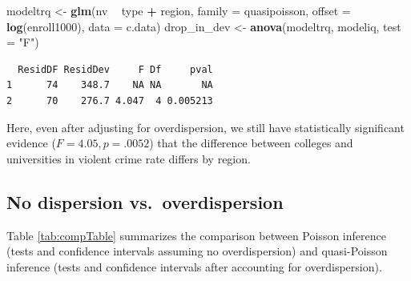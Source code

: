 \documentclass[
]{krantz}
\newenvironment{Shaded}{\begin{snugshade}}{\end{snugshade}}
\newcommand{\DataTypeTok}[1]{\textcolor[rgb]{0.27,0.27,0.27}{#1}}
\newcommand{\KeywordTok}[1]{\textcolor[rgb]{0.27,0.27,0.27}{\textbf{#1}}}
\newcommand{\NormalTok}[1]{#1}
\newcommand{\OperatorTok}[1]{\textcolor[rgb]{0.43,0.43,0.43}{\textbf{#1}}}
\newcommand{\StringTok}[1]{\textcolor[rgb]{0.5,0.5,0.5}{#1}}
\begin{document}
\begin{Shaded}
\begin{Highlighting}[]
\NormalTok{modeltrq <-}\StringTok{ }\KeywordTok{glm}\NormalTok{(nv }\OperatorTok{~}\StringTok{ }\NormalTok{type }\OperatorTok{+}\StringTok{ }\NormalTok{region, }\DataTypeTok{family =}\NormalTok{ quasipoisson,}
               \DataTypeTok{offset =} \KeywordTok{log}\NormalTok{(enroll1000), }\DataTypeTok{data =}\NormalTok{ c.data)}
\NormalTok{drop_in_dev <-}\StringTok{ }\KeywordTok{anova}\NormalTok{(modeltrq, modeliq, }\DataTypeTok{test =} \StringTok{"F"}\NormalTok{)}
\end{Highlighting}
\end{Shaded}

\begin{verbatim}
  ResidDF ResidDev     F Df     pval
1      74    348.7    NA NA       NA
2      70    276.7 4.047  4 0.005213
\end{verbatim}

Here, even after adjusting for overdispersion, we still have statistically significant evidence (\(F=4.05, p=.0052\)) that the difference between colleges and universities in violent crime rate differs by region.

\hypertarget{no-dispersion-vs.-overdispersion}{%
\subsection{No dispersion vs.~overdispersion}\label{no-dispersion-vs.-overdispersion}}

Table \ref{tab:compTable} summarizes the comparison between Poisson inference (tests and confidence intervals assuming no overdispersion) and quasi-Poisson inference (tests and confidence intervals after accounting for overdispersion).

\begin{table}

\caption{\label{tab:compTable}Comparison of Poisson and quasi-Poisson inference}
\centering
{}
\end{table}
\end{document}
